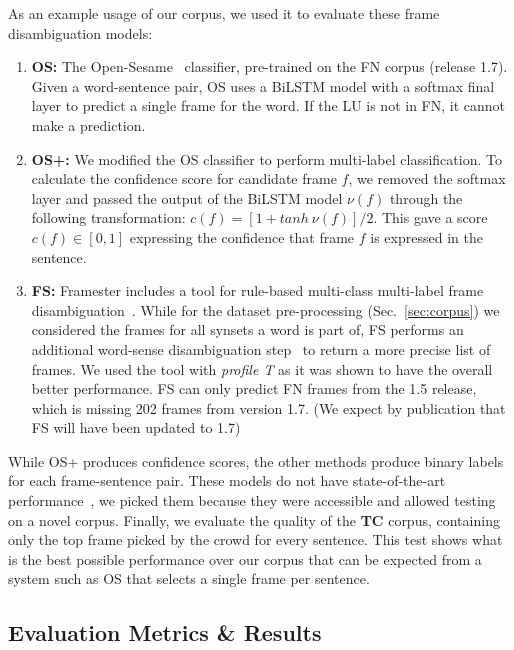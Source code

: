 As an example usage of our corpus, we used it to evaluate these frame disambiguation models:

\begin{enumerate} %
    \item \textbf{OS:} The Open-Sesame~\cite{swayamdipta:17} classifier, pre-trained on the FN corpus (release 1.7). Given a word-sentence pair, OS uses a BiLSTM model with a softmax final layer to predict a single frame for the word. If the LU is not in FN, it cannot make a prediction.
    
    \item \textbf{OS+:} We modified the OS classifier to perform multi-label classification. To calculate the confidence score for candidate frame $f$, we removed the softmax layer and passed the output of the BiLSTM model $\nu(f)$ through the following transformation: $c(f) = [1 + tanh \ \nu(f)] / 2$. This gave a score $c(f) \in [0,1]$ expressing the confidence that frame $f$ is expressed in the sentence.
    
    \item \textbf{FS:} Framester includes a  tool for rule-based multi-class multi-label frame disambiguation~\cite{gangemi2016framester}. While for the dataset pre-processing (Sec.~\ref{sec:corpus}) we considered the frames for all synsets a word is part of, FS performs an additional word-sense disambiguation step~\cite{moro2014entity} to return a more precise list of frames. We used the tool with \textit{profile T} as it was shown to have the overall better performance. FS can only predict FN frames from the 1.5 release, which is missing 202 frames from version 1.7. (We expect by publication that FS will have been updated to 1.7)
\end{enumerate}

While OS+ produces confidence scores, the other methods produce binary labels for each frame-sentence pair. These models do not have state-of-the-art performance~\cite{hermann2014semantic,fitzgerald2015semantic}, we picked them because they were accessible and allowed testing on a novel corpus. Finally, we evaluate the quality of the \textbf{TC} corpus, containing only the top frame picked by the crowd for every sentence. This test shows what is the best possible performance over our corpus that can be expected from a system such as OS that selects a single frame per sentence.

\subsection{Evaluation Metrics \& Results}

